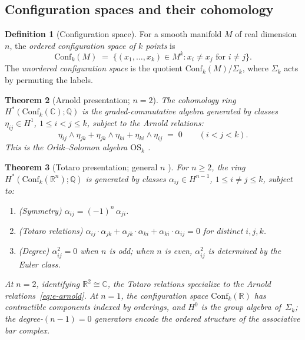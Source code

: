 \documentclass[11pt,reqno]{amsart}
\newtheorem{theorem}{Theorem}[section]
\theoremstyle{definition}
\newtheorem{definition}[theorem]{Definition}
\theoremstyle{remark}
\providecommand{\Conf}{\mathrm{Conf}}
\providecommand{\bC}{\mathbb{C}}
\providecommand{\bR}{\mathbb{R}}
\providecommand{\bQ}{\mathbb{Q}}
\begin{document}
\subsection{Configuration spaces and their cohomology}

\begin{definition}[Configuration space]\label{def:e-config}
For a smooth manifold $M$ of real dimension $n$, the
\emph{ordered configuration space of $k$ points} is
\[
\Conf_k(M)
\;=\;
\{(x_1,\ldots,x_k) \in M^k : x_i \neq x_j
\text{ for } i \neq j\}.
\]
The \emph{unordered configuration space} is the quotient
$\Conf_k(M)/\Sigma_k$, where $\Sigma_k$ acts by permuting
the labels.
\end{definition}

\begin{theorem}[Arnold presentation; $n = 2$]
\label{thm:e-arnold}
The cohomology ring $H^*(\Conf_k(\bC);\bQ)$ is the
graded-commutative algebra generated by classes
$\eta_{ij} \in H^1$, $1 \le i < j \le k$, subject to the
\emph{Arnold relations}:
\begin{equation}\label{eq:e-arnold}
\eta_{ij}\wedge\eta_{jk}
+ \eta_{jk}\wedge\eta_{ki}
+ \eta_{ki}\wedge\eta_{ij}
\;=\; 0
\qquad (i < j < k).
\end{equation}
This is the Orlik--Solomon algebra $\mathrm{OS}_k$
\textup{\cite{Arnold69}}.
\end{theorem}

\begin{theorem}[Totaro presentation; general $n$
\textup{\cite{Totaro96,Coh76}}]\label{thm:e-totaro}
For $n \ge 2$, the ring $H^*(\Conf_k(\bR^n);\bQ)$ is generated
by classes $\alpha_{ij} \in H^{n-1}$, $1 \le i \neq j \le k$,
subject to:
\begin{enumerate}[label=\textup{(\roman*)}]
\item \textup{(Symmetry)}\; $\alpha_{ij} = (-1)^n\,\alpha_{ji}$.
\item \textup{(Totaro relations)}\; $\alpha_{ij}\cdot\alpha_{jk}
 + \alpha_{jk}\cdot\alpha_{ki} + \alpha_{ki}\cdot\alpha_{ij} = 0$
 for distinct $i,j,k$.
\item \textup{(Degree)}\; $\alpha_{ij}^2 = 0$ when $n$ is odd;
 when $n$ is even, $\alpha_{ij}^2$ is determined by the Euler
 class.
\end{enumerate}
At $n = 2$, identifying $\bR^2 \cong \bC$, the Totaro relations
specialize to the Arnold relations~\eqref{eq:e-arnold}. At
$n = 1$, the configuration space $\Conf_k(\bR)$ has contractible
components indexed by orderings, and $H^0$ is the group algebra
of~$\Sigma_k$; the degree-$(n{-}1) = 0$ generators encode the
ordered structure of the associative bar complex.
\end{theorem}
\end{document}
